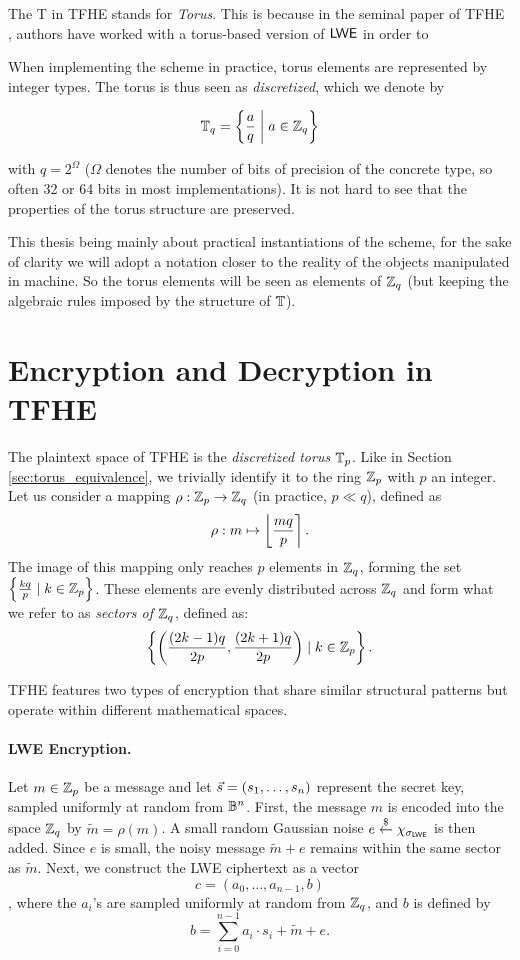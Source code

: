 The T in TFHE stands for \textit{Torus}. This is because in the seminal paper of TFHE \cite{}, authors have worked with a torus-based version of $\textsf{LWE}$ in order to 



When implementing the scheme in practice, torus elements are represented by integer types. The torus is thus seen as \textit{discretized}, which we denote by 

\[ \mathbb{T}_q = \left \{   \frac a q \;\middle|\; a \in \mathbb{Z}_q  \right \} \] 

with $q = 2^\Omega$ ($\Omega$ denotes the number of bits of precision of the concrete type, so often 32 or 64 bits in most implementations). It is not hard to see that the properties of the torus structure are preserved.

This thesis being mainly about practical instantiations of the scheme, for the sake of clarity we will adopt a notation closer to the reality of the objects manipulated in machine. So the torus elements will be seen as elements of $\mathbb{Z}_q$ (but keeping the algebraic rules imposed by the structure of $\mathbb{T}$).



\section{Encryption and Decryption in TFHE}


The plaintext space of TFHE is the \textit{discretized torus} $\mathbb{T}_p$. Like in Section \ref{sec:torus_equivalence}, we trivially identify it to the ring $\mathbb{Z}_p$ with $p$ an integer. Let us consider a mapping $\rho: \mathbb{Z}_p \rightarrow \mathbb{Z}_q$ (in practice, $p \ll q$), defined as \[
\rho: m  \mapsto \left \lfloor \frac{m q} {p} \right \rceil.
\]
The image of this mapping only reaches $p$ elements in $\mathbb{Z}_q$, forming the set $\left \{ \frac {k q}{p} \mid k \in \mathbb{Z}_p \right \}$. These elements are evenly distributed across $\mathbb{Z}_q$ and form what we refer to as \emph{sectors of $\mathbb{Z}_q$}, defined as: \[
\left \{ \left ( \frac{(2 k - 1)q}{2p}, \frac{(2k + 1)q}{2p} \right ) \mid k \in \mathbb{Z}_p \right \}.
\]

TFHE features two types of encryption that share similar structural patterns but operate within different mathematical spaces.


\paragraph{LWE Encryption.} Let $m \in \mathbb{Z}_p$ be a message and let $\vec s=(s_1, \dots, s_n)$ represent the secret key, sampled uniformly at random from $\mathbb{B}^n$. First, the message $m$ is encoded into the space $\mathbb{Z}_q$ by $\tilde m = \rho(m)$. A small random Gaussian noise $e \overset{\$}{\leftarrow} \chi_{\sigma_{\textsf{LWE}}}$ is then added. Since $e$ is small, the noisy message $\tilde m + e$ remains within the same sector as $\tilde m$. Next, we construct the LWE ciphertext as a vector \[c = (a_0, \dots, a_{n-1}, b)\], where the $a_i$'s are sampled uniformly at random from $\mathbb{Z}_q$, and $b$ is defined by \[b=\sum_{i=0}^{n-1} a_i \cdot s_i + \tilde m + e.\]


